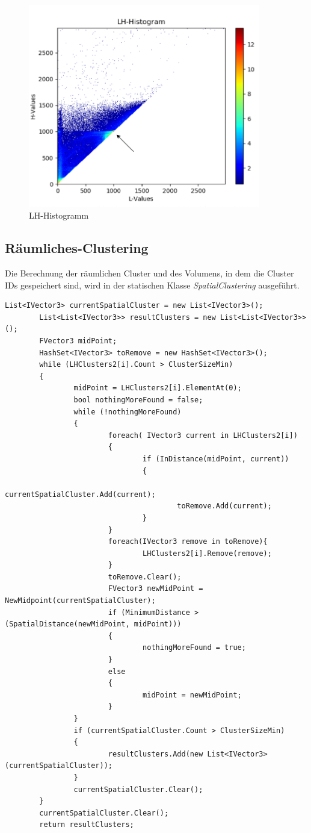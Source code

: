 \begin{figure}[H] 
\includegraphics[width=0.9\textwidth]{Logos/LHHistogram_a.png}
\caption{LH-Histogramm} 
\label{fig:lh_histo} 
\end{figure}



\subsection{Räumliches-Clustering}

Die Berechnung der räumlichen Cluster und des Volumens, in dem die Cluster IDs gespeichert sind, wird in der statischen Klasse \textit{SpatialClustering} ausgeführt.


\begin{lstlisting}[caption = Code zur Berechnung der räumlichen Cluster, label = lst:spatclust_code]
List<IVector3> currentSpatialCluster = new List<IVector3>();
		List<List<IVector3>> resultClusters = new List<List<IVector3>>();
		FVector3 midPoint;
		HashSet<IVector3> toRemove = new HashSet<IVector3>();
		while (LHClusters2[i].Count > ClusterSizeMin)
		{
				midPoint = LHClusters2[i].ElementAt(0);
				bool nothingMoreFound = false;
				while (!nothingMoreFound)
				{
						foreach( IVector3 current in LHClusters2[i])
						{
								if (InDistance(midPoint, current))
								{
										currentSpatialCluster.Add(current);
										toRemove.Add(current);
								}
						}
						foreach(IVector3 remove in toRemove){
								LHClusters2[i].Remove(remove);
						}
						toRemove.Clear();
						FVector3 newMidPoint = NewMidpoint(currentSpatialCluster);
						if (MinimumDistance > (SpatialDistance(newMidPoint, midPoint)))
						{
								nothingMoreFound = true;
						}
						else
						{
								midPoint = newMidPoint;
						}
				}
				if (currentSpatialCluster.Count > ClusterSizeMin)
				{
						resultClusters.Add(new List<IVector3>(currentSpatialCluster));		
				}
				currentSpatialCluster.Clear();
		}
		currentSpatialCluster.Clear();
		return resultClusters;

\end{lstlisting}


